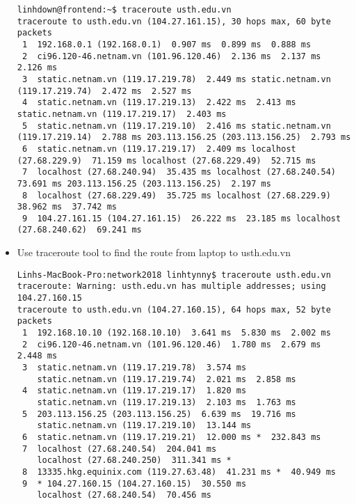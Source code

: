 \documentclass{article}
\begin{document}
\begin{itemize}
\begin{verbatim}
linhdown@frontend:~$ traceroute usth.edu.vn
traceroute to usth.edu.vn (104.27.161.15), 30 hops max, 60 byte packets
 1  192.168.0.1 (192.168.0.1)  0.907 ms  0.899 ms  0.888 ms
 2  ci96.120-46.netnam.vn (101.96.120.46)  2.136 ms  2.137 ms  2.126 ms
 3  static.netnam.vn (119.17.219.78)  2.449 ms static.netnam.vn (119.17.219.74)  2.472 ms  2.527 ms
 4  static.netnam.vn (119.17.219.13)  2.422 ms  2.413 ms static.netnam.vn (119.17.219.17)  2.403 ms
 5  static.netnam.vn (119.17.219.10)  2.416 ms static.netnam.vn (119.17.219.14)  2.788 ms 203.113.156.25 (203.113.156.25)  2.793 ms
 6  static.netnam.vn (119.17.219.17)  2.409 ms localhost (27.68.229.9)  71.159 ms localhost (27.68.229.49)  52.715 ms
 7  localhost (27.68.240.94)  35.435 ms localhost (27.68.240.54)  73.691 ms 203.113.156.25 (203.113.156.25)  2.197 ms
 8  localhost (27.68.229.49)  35.725 ms localhost (27.68.229.9)  38.962 ms  37.742 ms
 9  104.27.161.15 (104.27.161.15)  26.222 ms  23.185 ms localhost (27.68.240.62)  69.241 ms
\end{verbatim}

\bigskip


 \item Use traceroute tool to find the route from laptop to usth.edu.vn
 
\begin{verbatim}
Linhs-MacBook-Pro:network2018 linhtynny$ traceroute usth.edu.vn
traceroute: Warning: usth.edu.vn has multiple addresses; using 104.27.160.15
traceroute to usth.edu.vn (104.27.160.15), 64 hops max, 52 byte packets
 1  192.168.10.10 (192.168.10.10)  3.641 ms  5.830 ms  2.002 ms
 2  ci96.120-46.netnam.vn (101.96.120.46)  1.780 ms  2.679 ms  2.448 ms
 3  static.netnam.vn (119.17.219.78)  3.574 ms
    static.netnam.vn (119.17.219.74)  2.021 ms  2.858 ms
 4  static.netnam.vn (119.17.219.17)  1.820 ms
    static.netnam.vn (119.17.219.13)  2.103 ms  1.763 ms
 5  203.113.156.25 (203.113.156.25)  6.639 ms  19.716 ms
    static.netnam.vn (119.17.219.10)  13.144 ms
 6  static.netnam.vn (119.17.219.21)  12.000 ms *  232.843 ms
 7  localhost (27.68.240.54)  204.041 ms
    localhost (27.68.240.250)  311.341 ms *
 8  13335.hkg.equinix.com (119.27.63.48)  41.231 ms *  40.949 ms
 9  * 104.27.160.15 (104.27.160.15)  30.550 ms
    localhost (27.68.240.54)  70.456 ms
\end{verbatim}

\end{itemize}
\end{document}
